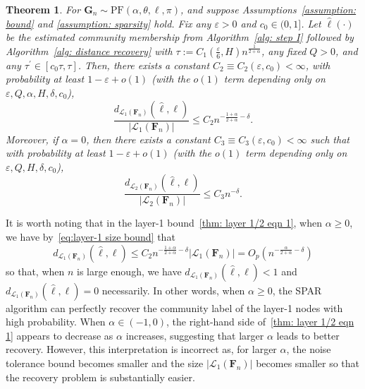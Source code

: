 \documentclass[twoside,11pt]{article}
\newtheorem{thy}[theorem]{Theorem}
\theoremstyle{remark}
\begin{document}
\begin{thy}
\label{thm: layer 1/2}
For $\boldsymbol{G}_n \sim \mathrm{PF}(\alpha, \theta, \ell, \pi)$, and suppose Assumptions~\ref{assumption: bound} and \ref{assumption: sparsity} hold. 
Fix any $\varepsilon > 0$ and $c_0 \in (0, 1]$. 
Let $\hat{\ell}(\cdot)$ be the estimated community membership from Algorithm~\ref{alg: step I} followed by Algorithm~\ref{alg: distance recovery} with $\tau  := C_1(\frac{\varepsilon}{6}, H)n^{\frac{1}{2+\alpha}}$, any fixed $Q>0$, and any $\tau^\prime \in [c_0 \tau, \tau]$.
Then, there exists a constant $C_2 \equiv C_2(\varepsilon, c_0) <\infty$, with probability at least $1-\varepsilon+o(1)$ (with the $o(1)$ term depending only on $\varepsilon, Q, \alpha, H, \delta, c_0$),
%
\begin{equation}    
\label{thm: layer 1/2 eqn 1}
\frac{d_{\mathcal{L}_1\left(\bm{F}_n\right)}(\hat{\ell},\ell)}{\left|\mathcal{L}_1\left(\boldsymbol{F}_n\right)\right|}\le  C_2 n^{-\frac{1+\alpha}{2+\alpha}-\delta}.
\end{equation}
%
Moreover, if $\alpha=0$, then there exists a constant $C_3 \equiv C_3(\varepsilon, c_0) <\infty$ such that with probability at least $1-\varepsilon+o(1)$ (with the $o(1)$ term depending only on $\varepsilon, Q, H, \delta, c_0$), 
%
\begin{equation}
\label{thm: layer 1/2 eqn 2}
\frac{d_{\mathcal{L}_2\left(\bm{F}_n\right)}(\hat{\ell},\ell)}{\left|\mathcal{L}_2\left(\boldsymbol{F}_n\right)\right|}\le  C_3 n^{-\delta}.
\end{equation}
%
\end{thy}

\begin{remark}
It is worth noting that in the layer-1 bound~\eqref{thm: layer 1/2 eqn 1}, when $\alpha \geq 0$, we have by~\eqref{eq:layer-1 size bound} that
\[
d_{\mathcal{L}_1\left(\bm{F}_n\right)}(\hat{\ell},\ell)\le  C_2 n^{-\frac{1+\alpha}{2+\alpha}-\delta} \left|\mathcal{L}_1\left(\boldsymbol{F}_n\right)\right| = O_p( n^{-\frac{\alpha}{2+\alpha} - \delta}) 
\]
so that, when $n$ is large enough, we have $d_{\mathcal{L}_1\left(\bm{F}_n\right)}(\hat{\ell},\ell) < 1$ and $d_{\mathcal{L}_1\left(\bm{F}_n\right)}(\hat{\ell},\ell) = 0$ necessarily. In other words, when $\alpha \geq 0$, the SPAR algorithm can perfectly recover the community label of the layer-1 nodes with high probability. When $\alpha \in (-1, 0)$, the right-hand side of~\eqref{thm: layer 1/2 eqn 1} appears to decrease as $\alpha$ increases, suggesting that larger $\alpha$ leads to better recovery. However, this interpretation is incorrect as, for larger $\alpha$, the noise tolerance bound becomes smaller and the size $|\mathcal{L}_1(\bm{F}_n)|$ becomes smaller so that the recovery problem is substantially easier. 
\end{remark}
\end{document}
